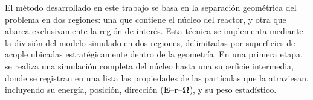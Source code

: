 



El método desarrollado en este trabajo se basa en la separación geométrica del problema en dos regiones: una que contiene el núcleo del reactor, y otra que abarca exclusivamente la región de interés. Esta técnica se implementa mediante la división del modelo simulado en dos regiones, delimitadas por superficies de acople ubicadas estratégicamente dentro de la geometría. En una primera etapa, se realiza una simulación completa del núcleo hasta una superficie intermedia, donde se registran en una lista las propiedades de las partículas que la atraviesan, incluyendo su energía, posición, dirección ($\mathbf{E}$–$\mathbf{r}$–$\boldsymbol{\Omega}$), y su peso estadístico.

